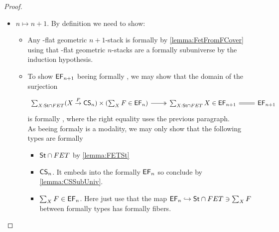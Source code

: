 \begin{proof}
\begin{itemize}
\begin{itemize}
		\end{itemize}
		\item $n \mapsto n+1$. By definition we need to show:
		\begin{itemize}
			\item Any \etale-flat geometric $n+1$-stack is formally \etale by \ref{lemma:FetFromFCover} using that \etale-flat geometric $n$-stacks are a formally \etale subuniverse by the induction hypothesis.
			\item To show $\mathsf{EF}_{n+1}$ beeing formally \etale, we may show \todocite that the domain of the surjection
			\[\begin{tikzcd}
				{\sum_{X : \St \cap FET}(X \overset{F}{\to} \CS_{n}) \times (\sum_{X} F \in \EF_n)} & {\sum_{X : \St \cap FET} X \in \EF_{n+1}} & {\EF_{n+1}}
				\arrow[two heads, from=1-1, to=1-2]
				\arrow[Rightarrow, no head, from=1-2, to=1-3]
			\end{tikzcd}\]
			is formally \etale, where the right equality uses the previous paragraph. \\
			As beeing formaly \etale is a modality, we may only show that the following types are formally \etale
			\begin{itemize}
				\item $\mathsf{St} \cap FET$ by \ref{lemma:FETSt}
				\item $\mathsf{CS}_n$. It embeds into the formally \etale $\mathsf{EF}_n$ so conclude by \ref{lemma:CSSubUniv}.
				\item $\sum_X F \in \mathsf{EF}_n$. Here just use that the map $\mathsf{EF}_n \hookrightarrow \mathsf{St} \cap FET \ni \sum_X F$ between formally \etale types has formally \etale fibers.
			\end{itemize} 
		\end{itemize}
	\end{itemize}
\end{proof}
